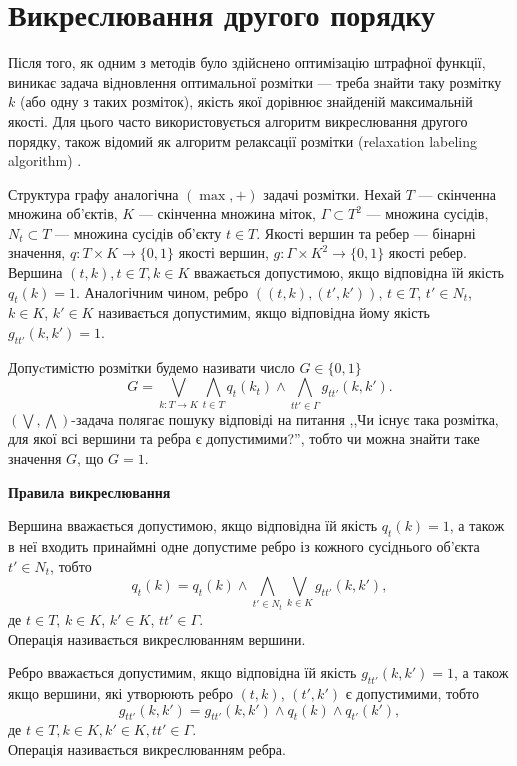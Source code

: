 \section{Викреслювання другого порядку}

Після того, як одним з методів було здійснено оптимізацію штрафної функції, 
виникає задача відновлення оптимальної розмітки --- треба знайти таку розмітку $k$
(або одну з таких розміток), якість якої дорівнює знайденій максимальній якості.
Для цього часто використовується алгоритм викреслювання другого порядку, також
відомий як алгоритм релаксації розмітки (relaxation labeling algorithm) \cite{savchynskyy,koval,rossi, Vodolazskii:2015}.

Структура графу аналогічна $(\max,+)$ задачі розмітки. Нехай $T$ --- скінченна
множина об'єктів, $K$ --- скінченна множина міток, $\Gamma \subset T^2$ --- множина сусідів, 
$N_t\subset T$ --- множина сусідів об'єкту $t\in T$.
Якості вершин та ребер --- бінарні значення,
 $q:T\times K\rightarrow\{0,1\}$ якості вершин, 
$g:\Gamma\times K^2\rightarrow\{0,1\}$ якості ребер. Вершина $(t,k), t\in T, k\in K$ вважається
допустимою, якщо відповідна їй якість $q_t(k)=1$. Аналогічним чином, ребро 
$((t,k),(t',k'))$, $t\in T$, $t'\in N_t$, $k\in K$, $k'\in K$ називається допустимим, якщо відповідна йому якість $g_{tt'}(k,k')=1$.

Допуcтимістю розмітки будемо називати
число $G\in\{0,1\}$
\begin{equation}
      G=\bigvee_{k: T \rightarrow K} \bigwedge_{t\in T}q_t(k_t)\wedge\bigwedge_{tt' \in \Gamma} g_{tt'}(k,k').
  \end{equation}
$(\bigvee, \bigwedge)$-задача полягає пошуку відповіді на питання ,,Чи існує 
така розмітка, для якої всі вершини та ребра є допустимими?'', тобто чи можна 
знайти таке значення $G$, що $G=1$.

\textbf{Правила викреслювання}

Вершина вважається допустимою, якщо відповідна їй якість $q_t(k)=1$, 
а також в неї входить принаймні одне допустиме ребро із кожного сусіднього
об'єкта $t'\in N_t$, тобто
\begin{equation}
    q_t(k) = q_t(k)\wedge\bigwedge_{t'\in N_t}\bigvee_{k\in K}g_{tt'}(k,k'),
\end{equation}
де $t\in T$, $k\in K$, $k'\in K$, $tt'\in\Gamma$.\\ 
Операція називається викреслюванням вершини.

Ребро вважається допустимим, якщо відповідна їй якість $g_{tt'}(k,k')=1$,
а також якщо вершини, які утворюють ребро $(t,k)$, $(t',k')$ є допустимими, тобто
\begin{equation}
    g_{tt'}(k,k') = g_{tt'}(k,k')\wedge q_t(k)\wedge q_{t'}(k'),
\end{equation}
де $t\in T, k\in K, k'\in K, tt'\in\Gamma$.\\
Операція називається викреслюванням ребра.

